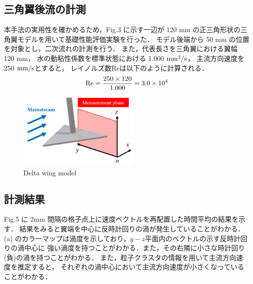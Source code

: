 \documentclass[twocolumn,a4j]{jsarticle}
\begin{document}
\subsection{三角翼後流の計測}
本手法の実用性を確かめるため，Fig.3 に示す一辺が
120 mm の正三角形状の三角翼モデルを用いて基礎性能評価実験を行った．
モデル後端から 50 mm の位置を対象とし，二次流れの計測を行う．
また，代表長さを三角翼における翼幅 120 mm，
水の動粘性係数を標準状態における 1.000 $\rm{mm}^2/\rm{s}$，
主流方向速度を 250 $\rm{mm}/\rm{s}$とすると，
レイノルズ数Reは以下のように計算される．
\begin{eqnarray*}
  \rm{Re} = \frac{250 \times 120}{1.000} = 3.0 \times 10^4
\end{eqnarray*}

\begin{figure}[htbp]
  \centering
  \includegraphics[keepaspectratio, width=60mm]{../images/ImageofDeltaWing.png}
  \caption{Delta wing model}
\end{figure}

\subsection{計測結果}
Fig.5 に 2mm 間隔の格子点上に速度ベクトルを再配置した時間平均の結果を示す．
結果をみると翼端を中心に反時計回りの渦が発生していることがわかる．
(a) のカラーマップは渦度を示しており，$y-z$平面内のベクトルの示す反時計回りの渦中心に
強い渦度を持つことがわかる．また，その右隣に小さな時計回り(負)の渦を持つことがわかる．
また，粒子クラスタの情報を用いて主流方向速度を推定すると，
それぞれの渦中心において主流方向速度が小さくなっていることがわかる．
\end{document}
